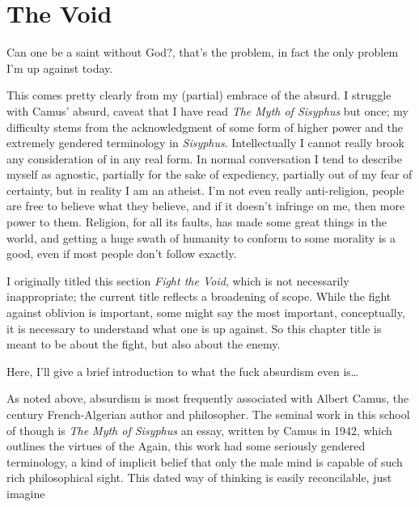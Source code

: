 \documentclass[../butidigress.tex]{subfiles}
\begin{document}
\chapter{The Void}\label{chap:thevoid}
\epigraph{Can one be a saint without God?, that's the problem, in fact the only problem I'm up against today.}{}
\newpage
This comes pretty clearly from my (partial) embrace of the absurd.
I struggle with Camus' absurd, caveat that I have read \textit{The Myth of Sisyphus} but once; my difficulty stems from the acknowledgment of some form of higher power and the extremely gendered terminology in \textit{Sisyphus}.
Intellectually I cannot really brook any consideration of  in any real form.
In normal conversation I tend to describe myself as agnostic, partially for the sake of expediency, partially out of my fear of certainty, but in reality I am an atheist.
I'm not even really anti-religion, people are free to believe what they believe, and if it doesn't infringe on me, then more power to them.
Religion, for all its faults, has made some great things in the world, and getting a huge swath of humanity to conform to some morality is a good, even if most people don't follow exactly.

I originally titled this section \textit{Fight the Void}, which is not necessarily inappropriate; the current title reflects a broadening of scope.
While the fight against oblivion is important, some might say the most important, conceptually, it is necessary to understand what one is up against.
So this chapter title is meant to be about the fight, but also about the enemy.

\entryskip

Here, I'll give a brief introduction to what the fuck absurdism even is\ldots

As noted above, absurdism is most frequently associated with Albert Camus, the  century French-Algerian author and philosopher.
The seminal work in this school of though is \textit{The Myth of Sisyphus} an essay, written by Camus in 1942, which outlines the virtues of the 
Again, this work had some seriously gendered terminology, a kind of implicit belief that only the male mind is capable of such rich philosophical sight.
This dated way of thinking is easily reconcilable, just imagine 
\end{document}
